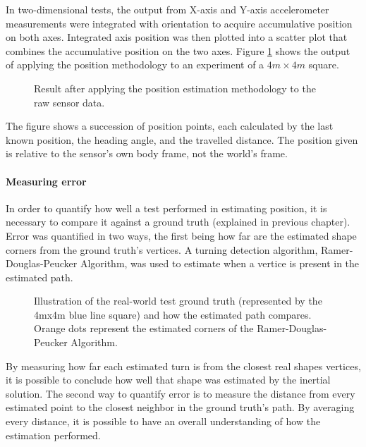 In two-dimensional tests, the output from X-axis and Y-axis accelerometer measurements were integrated with orientation to acquire accumulative position on both axes. Integrated axis position was then plotted into a scatter plot that combines the accumulative position on the two axes. Figure \ref{fig:square} shows the output of applying the position methodology to an experiment of a $4m\times 4m$ square.

\begin{figure}[!h]
    \centering
    \resizebox{0.8\linewidth}{!}{}
    \caption{ Result after applying the position estimation methodology to the raw sensor data. }
    \label{fig:square}
\end{figure}

The figure shows a succession of position points, each calculated by the last known position, the heading angle, and the travelled distance. The position given is relative to the sensor's own body frame, not the world's frame.

\paragraph{Measuring error}

In order to quantify how well a test performed in estimating position, it is necessary to compare it against a ground truth (explained in previous chapter). Error was quantified in two ways, the first being how far are the estimated shape corners from the ground truth's vertices. A turning detection algorithm, Ramer-Douglas-Peucker Algorithm, was used to estimate when a vertice is present in the estimated path.

\begin{figure}[!h]
    \centering
    \resizebox{0.8\linewidth}{!}{}
    \caption{Illustration of the real-world test ground truth (represented by the 4mx4m  blue line square) and how the estimated path compares. Orange dots represent the estimated corners of the Ramer-Douglas-Peucker Algorithm. }
    \label{fig:square_truth}
\end{figure}

By measuring how far each estimated turn is from the closest real shapes vertices, it is possible to conclude how well that shape was estimated by the inertial solution.
The second way to quantify error is to measure the distance from every estimated point to the closest neighbor in the ground truth's path. By averaging every distance, it is possible to have an overall understanding of how the estimation performed.

